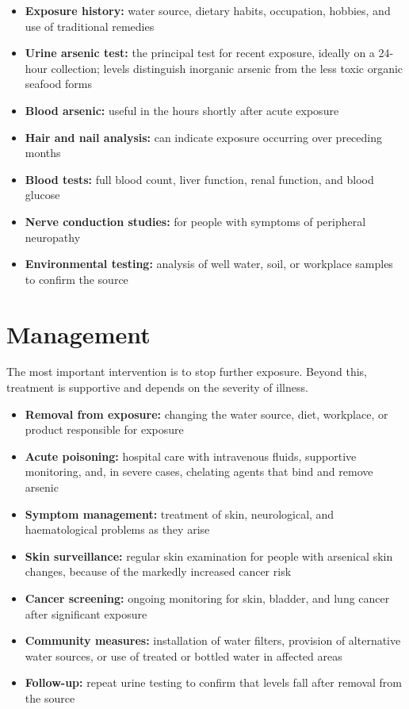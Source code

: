 \begin{itemize}
    \item \textbf{Exposure history:} water source, dietary habits, occupation, hobbies, and use of traditional remedies
    \item \textbf{Urine arsenic test:} the principal test for recent exposure, ideally on a 24-hour collection; levels distinguish inorganic arsenic from the less toxic organic seafood forms
    \item \textbf{Blood arsenic:} useful in the hours shortly after acute exposure
    \item \textbf{Hair and nail analysis:} can indicate exposure occurring over preceding months
    \item \textbf{Blood tests:} full blood count, liver function, renal function, and blood glucose
    \item \textbf{Nerve conduction studies:} for people with symptoms of peripheral neuropathy
    \item \textbf{Environmental testing:} analysis of well water, soil, or workplace samples to confirm the source
\end{itemize}

\section*{Management}
The most important intervention is to stop further exposure. Beyond this, treatment is supportive and depends on the severity of illness.

\begin{itemize}
    \item \textbf{Removal from exposure:} changing the water source, diet, workplace, or product responsible for exposure
    \item \textbf{Acute poisoning:} hospital care with intravenous fluids, supportive monitoring, and, in severe cases, chelating agents that bind and remove arsenic
    \item \textbf{Symptom management:} treatment of skin, neurological, and haematological problems as they arise
    \item \textbf{Skin surveillance:} regular skin examination for people with arsenical skin changes, because of the markedly increased cancer risk
    \item \textbf{Cancer screening:} ongoing monitoring for skin, bladder, and lung cancer after significant exposure
    \item \textbf{Community measures:} installation of water filters, provision of alternative water sources, or use of treated or bottled water in affected areas
    \item \textbf{Follow-up:} repeat urine testing to confirm that levels fall after removal from the source
\end{itemize}

